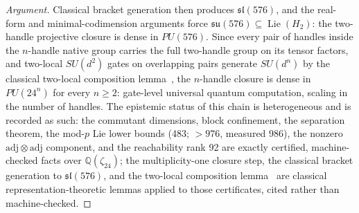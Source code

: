 \begin{proof}[Argument]
Classical bracket generation then produces $\mathfrak{sl}(576)$, and the real-form and minimal-codimension arguments force $\mathfrak{su}(576)\subseteq\operatorname{Lie}(H_2)$: the two-handle projective closure is dense in $PU(576)$.
Since every pair of handles inside the $n$-handle native group carries the full two-handle group on its tensor factors, and two-local $SU(d^{2})$ gates on overlapping pairs generate $SU(d^{n})$ by the classical two-local composition lemma~\cite{brylinski2002}, the $n$-handle closure is dense in $PU(24^{n})$ for every $n\ge 2$: gate-level universal quantum computation, scaling in the number of handles.
The epistemic status of this chain is heterogeneous and is recorded as such: the commutant dimensions, block confinement, the separation theorem, the mod-$p$ Lie lower bounds (483; $>976$, measured 986), the nonzero $\mathrm{adj}\otimes\mathrm{adj}$ component, and the reachability rank 92 are exactly certified, machine-checked facts over $\mathbb{Q}(\zeta_{24})$; the multiplicity-one closure step, the classical bracket generation to $\mathfrak{sl}(576)$, and the two-local composition lemma~\cite{brylinski2002} are classical representation-theoretic lemmas applied to those certificates, cited rather than machine-checked.
\end{proof}


